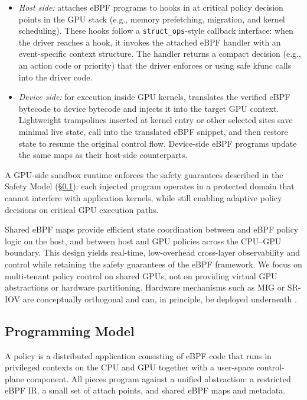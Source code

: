 \begin{itemize}[leftmargin=*]
  \item \emph{Host side:} \sys attaches eBPF programs to hooks in \sysdriver at critical policy decision points in the GPU stack (e.g., memory prefetching, migration, and kernel scheduling). These hooks follow a \texttt{struct\_ops}-style callback interface: when the driver reaches a hook, it invokes the attached eBPF handler with an event-specific context structure. The handler returns a compact decision (e.g., an action code or priority) that the driver enforces or using safe kfunc calls into the driver code.
  \item \emph{Device side:} for execution inside GPU kernels, \sys translates the verified eBPF bytecode to device bytecode and injects it into the target GPU context. Lightweight trampolines inserted at kernel entry or other selected sites save minimal live state, call into the translated eBPF snippet, and then restore state to resume the original control flow. Device-side eBPF programs update the same maps as their host-side counterparts.
\end{itemize}

A GPU-side sandbox runtime enforces the safety guarantees described in the Safety Model (\S\ref{sec:prog-model}): each injected program operates in a protected domain that cannot interfere with application kernels, while still enabling adaptive policy decisions on critical GPU execution paths.

Shared eBPF maps provide efficient state coordination between \sysdriver and eBPF policy logic on the host, and between host and GPU policies across the CPU--GPU boundary. This design yields real-time, low-overhead cross-layer observability and control while retaining the safety guarantees of the eBPF framework. We focus on multi-tenant policy control on shared GPUs, not on providing virtual GPU abstractions or hardware partitioning. Hardware mechanisms such as MIG or SR-IOV are conceptually orthogonal and can, in principle, be deployed underneath \sys.


\subsection{\sys Programming Model}
\label{sec:prog-model}

A \sys policy is a distributed application consisting of eBPF code that runs in
privileged contexts on the CPU and GPU together with a user-space control-plane
component. All pieces program against a unified abstraction: a restricted eBPF IR,
a small set of attach points, and shared eBPF maps and metadata.

